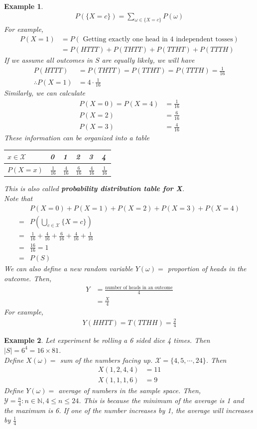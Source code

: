 \documentclass[11pt,oneside]{book}
\theoremstyle{newStyle}
\newtheorem{ex}{Example}[section]
\newcommand{\N}{\mathbb{N}}
\newcommand{\X}{\mathcal{X}}
\begin{document}
\begin{ex}
\begin{align*}
P\left( \{X=c\} \right)=\sum_{\omega \in \{X=c\}}P(\omega)
\end{align*}
For example, \begin{align*}
P(X=1)&=P(\text{ Getting exactly one head in 4 independent tosses})\\
&=P(HTTT)+P(THTT)+P(TTHT)+P(TTTH)
\end{align*}
If we assume all outcomes in $S$ are equally likely, we will have \begin{align*}
P(HTTT)&=P(THTT)=P(TTHT)=P(TTTH)=\frac{1}{16}\\
\therefore P(X=1)&=4\cdot \frac{1}{16}
\end{align*}
Similarly, we can calculate \begin{align*}
P(X=0)=P(X=4)&=\frac{1}{16}\\
P(X=2)&=\frac{6}{16}\\
P(X=3)&=\frac{4}{16}
\end{align*}
These information can be organized into a table \begin{center}
\begin{tabular}{|l|l|l|l|l|l|}
\hline
$x\in \X$ & 0              & 1              & 2              & 3              & 4              \\ \hline
$P(X=x)$  & $\frac{1}{16}$ & $\frac{4}{16}$ & $\frac{6}{16}$ & $\frac{4}{16}$ & $\frac{1}{16}$ \\ \hline
\end{tabular}
\end{center}
This is also called \textbf{probability distribution table for X}.\\
Note that \begin{align*}
&P(X=0)+P(X=1)+P(X=2)+P(X=3)+P(X=4)\\
=&P\left( \bigcup_{c\in\X}\{X=c\}\right)\\
=&\frac{1}{16}+\frac{4}{16}+\frac{6}{16}+\frac{4}{16}+\frac{1}{16}\\
=&\frac{16}{16}=1\\
=&P(S)
\end{align*}
We can also define a new random variable $Y(\omega)=$ proportion of heads in the outcome. Then, \begin{align*}
Y&=\frac{\text{number of heads in an outcome}}{4}\\
&=\frac{X}{4}
\end{align*}
For example, \begin{align*}
Y(HHTT)=T(TTHH)=\frac{2}{4}
\end{align*}
\end{ex}
\begin{ex}
Let experiment be rolling a 6 sided dice 4 times. Then $|S|=6^4=16\times
 81$.\\
Define $X(\omega)=$ sum of the numbers facing up. $\X=\{4,5,\cdots,24\}$. Then \begin{align*}
 X(1,2,4,4)&=11\\
 X(1,1,1,6)&=9
 \end{align*}
Define $Y(\omega)=$ average of numbers in the sample space. Then, $\mathcal{Y}={\frac{n}{4}:n\in \N,4\leq n \leq 24}$. This is because the minimum of the average is 1 and the maximum is 6. If one of the number increases by 1, the average will increases by $\frac{1}{4}$
\end{ex}
\end{document}
